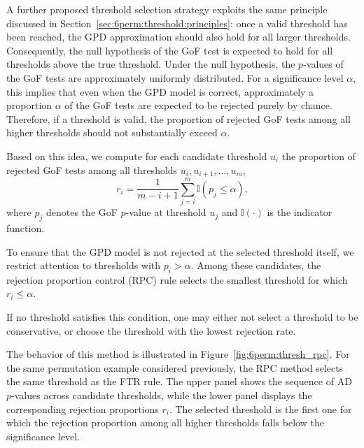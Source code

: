 A further proposed threshold selection strategy exploits the same principle discussed in Section~\ref{sec:6perm:threshold:principles}: once a valid threshold has been reached, the GPD approximation should also hold for all larger thresholds. Consequently, the null hypothesis of the GoF test is expected to hold for all thresholds above the true threshold.
Under the null hypothesis, the $p$-values of the GoF tests are approximately uniformly distributed. For a significance level $\alpha$, this implies that even when the GPD model is correct, approximately a proportion $\alpha$ of the GoF tests are expected to be rejected purely by chance. Therefore, if a threshold is valid, the proportion of rejected GoF tests among all higher thresholds should not substantially exceed $\alpha$.

Based on this idea, we compute for each candidate threshold $u_i$ the proportion of rejected GoF tests among all thresholds $u_i, u_{i+1}, \dots, u_m$,
\begin{equation}
\label{eq:6perm:rpc}
r_i = \frac{1}{m-i+1} \sum_{j=i}^{m} \mathbb{I}(p_j \le \alpha),
\end{equation}
where $p_j$ denotes the GoF $p$-value at threshold $u_j$ and $\mathbb{I}(\cdot)$ is the indicator function.

To ensure that the GPD model is not rejected at the selected threshold itself, we restrict attention to thresholds with $p_i > \alpha$. 
Among these candidates, the rejection proportion control (RPC) rule selects the smallest threshold for which $r_i \le \alpha$.

If no threshold satisfies this condition, one may either not select a threshold to be conservative, or choose the threshold with the lowest rejection rate.

The behavior of this method is illustrated in Figure~\ref{fig:6perm:thresh_rpc}. 
For the same permutation example considered previously, the RPC method selects the same threshold as the FTR rule. 
The upper panel shows the sequence of AD $p$-values across candidate thresholds, while the lower panel displays the corresponding rejection proportions $r_i$. The selected threshold is the first one for which the rejection proportion among all higher thresholds falls below the significance level.

